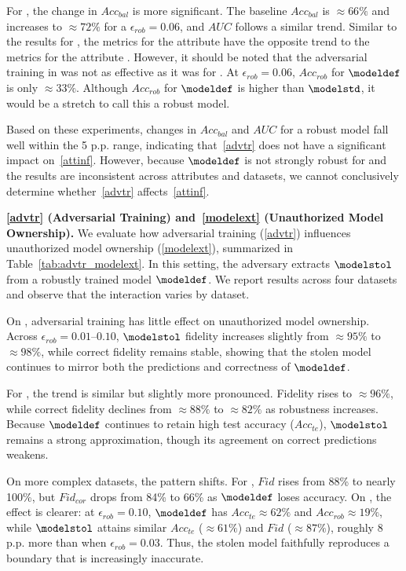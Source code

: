 For \lfw, the change in $Acc_{bal}$ is more significant.
The baseline $Acc_{bal}$ is $\approx66\%$ and increases to $\approx72\%$ for a $\epsilon_{rob} = 0.06$, and $AUC$ follows a similar trend.
Similar to the results for \census, the metrics for the attribute \sex have the opposite trend to the metrics for the attribute \race.
However, it should be noted that the adversarial training in \lfw was not as effective as it was for \census.
At $\epsilon_{rob} = 0.06$, $Acc_{rob}$ for $\modeldef$ is only $\approx33\%$.
Although $Acc_{rob}$ for $\modeldef$ is higher than $\modelstd$, it would be a stretch to call this a robust model.

Based on these experiments, changes in $Acc_{bal}$ and $AUC$ for a robust model fall well within the 5 p.p. range, indicating that~\ref{advtr} does not have a significant impact on~\ref{attinf}.
However, because $\modeldef$ is not strongly robust for \lfw and the results are inconsistent across attributes and datasets, we cannot conclusively determine whether~\ref{advtr} affects~\ref{attinf}.



\noindent\textbf{\ref{advtr} (Adversarial Training) and~\ref{modelext} (Unauthorized Model Ownership).}
We evaluate how adversarial training (\ref{advtr}) influences unauthorized model ownership (\ref{modelext}), summarized in Table~\ref{tab:advtr_modelext}.
In this setting, the adversary extracts $\modelstol$ from a robustly trained model $\modeldef$.
We report results across four datasets and observe that the interaction varies by dataset.

On \census, adversarial training has little effect on unauthorized model ownership.
Across $\epsilon_{rob}=0.01$--$0.10$, $\modelstol$ fidelity increases slightly from $\approx95\%$ to $\approx98\%$, while correct fidelity remains stable, showing that the stolen model continues to mirror both the predictions and correctness of $\modeldef$.

For \fmnist, the trend is similar but slightly more pronounced.
Fidelity rises to $\approx96\%$, while correct fidelity declines from $\approx88\%$ to $\approx82\%$ as robustness increases.
Because $\modeldef$ continues to retain high test accuracy ($Acc_{te}$), $\modelstol$ remains a strong approximation, though its agreement on correct predictions weakens.

On more complex datasets, the pattern shifts.
For \lfw, $Fid$ rises from 88\% to nearly 100\%, but $Fid_{cor}$ drops from 84\% to 66\% as $\modeldef$ loses accuracy.
On \cifar, the effect is clearer: at $\epsilon_{rob}=0.10$, $\modeldef$ has $Acc_{te}\approx62\%$ and $Acc_{rob}\approx19\%$, while $\modelstol$ attains similar $Acc_{te}$ ($\approx61\%$) and $Fid$ ($\approx87\%$), roughly $8$ p.p. more than when $\epsilon_{rob}=0.03$.
Thus, the stolen model faithfully reproduces a boundary that is increasingly inaccurate.

